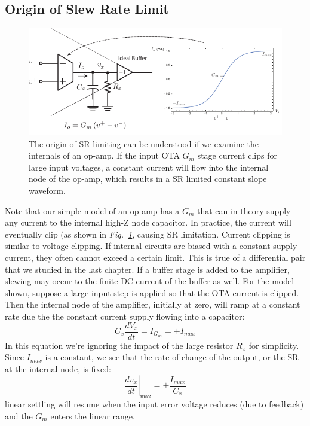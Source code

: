 \subsection{Origin of Slew Rate Limit}
\begin{figure}[tb]
\centering
\includegraphics[width=\columnwidth]{opamp_ota_SR}
\caption{The origin of SR limiting can be understood if we examine the internals of an op-amp. If the input OTA $G_m$ stage current clips for large input voltages, a constant current will flow into the internal node of the op-amp, which results in a SR limited constant slope waveform.}
\label{fig:opamp_ota_SR}
\end{figure}

Note that our simple model of an op-amp has a $G_m$ that can in theory supply any current to the internal high-Z node capacitor. In practice, the current will eventually clip (as shown in \emph{Fig.~\ref{fig:opamp_ota_SR}}, causing SR limitation.  Current clipping is similar to voltage clipping. If internal circuits are biased with a constant supply current, they often cannot exceed a certain limit.  This is true of a differential pair that we studied in the last chapter.  If a buffer stage is added to the amplifier, slewing may occur to the finite DC current of the buffer as well.  For the model shown, suppose a large input step is applied so that the OTA current is clipped.  Then the internal node of the amplifier, initially at zero, will ramp at a constant rate due the the constant current supply flowing into a capacitor:
    \begin{equation}
        C_x \frac{dV_x}{dt} = I_{G_m} = \pm I_{max} 
    \end{equation}
In this equation we're ignoring the impact of the large resistor $R_x$ for simplicity.  Since $I_{max}$ is a constant, we see that the rate of change of the output, or the SR at the internal node, is fixed:
    \begin{equation}
        \left.	\frac{dv_x}{dt} \right|_{\text{max}} = \pm \frac{I_{max}}{C_x} 
    \end{equation}
linear settling will resume when the input error voltage reduces (due to feedback) and the $G_m$ enters the linear range.
